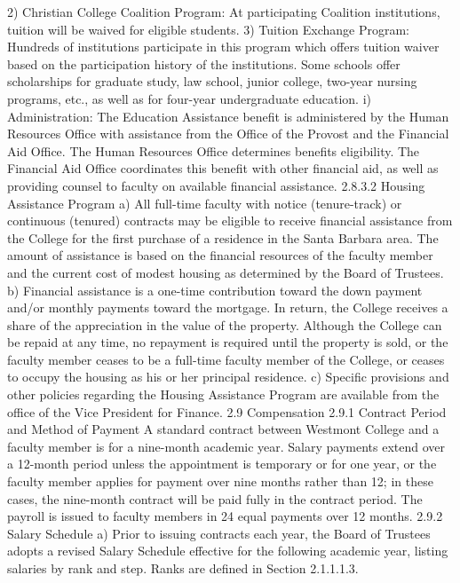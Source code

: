 \documentclass[letterpaper, 11pt]{article}
\begin{document}
2) Christian College Coalition Program:  At participating Coalition institutions, tuition will be waived for eligible students.
3) Tuition Exchange Program:  Hundreds of institutions participate in this program which offers tuition waiver based on the participation history of the institutions. Some schools offer scholarships for graduate study, law school, junior college, two-year nursing programs, etc., as well as for four-year undergraduate education.
i) Administration:
   The Education Assistance benefit is administered by the Human Resources Office with assistance from the Office of the Provost and the Financial Aid Office.  The Human Resources Office determines benefits eligibility.  The Financial Aid Office coordinates this benefit with other financial aid, as well as providing counsel to faculty on available financial assistance.
2.8.3.2 Housing Assistance Program
a) All full-time faculty with notice (tenure-track) or continuous (tenured) contracts may be eligible to receive financial assistance from the College for the first purchase of a residence in the Santa Barbara area.  The amount of assistance is based on the financial resources of the faculty member and the current cost of modest housing as determined by the Board of Trustees.
b) Financial assistance is a one-time contribution toward the down payment and/or monthly payments toward the mortgage.  In return, the College receives a share of the appreciation in the value of the property.  Although the College can be repaid at any time, no repayment is required until the property is sold, or the faculty member ceases to be a full-time faculty member of the College, or ceases to occupy the housing as his or her principal residence.
c) Specific provisions and other policies regarding the Housing Assistance Program are available from the office of the Vice President for Finance.
2.9 Compensation
2.9.1 Contract Period and Method of Payment
   A standard contract between Westmont College and a faculty member is for a nine-month academic year.  Salary payments extend over a 12-month period unless the appointment is temporary or for one year, or the faculty member applies for payment over nine months rather than 12; in these cases, the nine-month contract will be paid fully in the contract period.  The payroll is issued to faculty members in 24 equal payments over 12 months.
2.9.2 Salary Schedule
a) Prior to issuing contracts each year, the Board of Trustees adopts a revised Salary Schedule effective for the following academic year, listing salaries by rank and step.  Ranks are defined in Section 2.1.1.1.3.  
\end{document}
